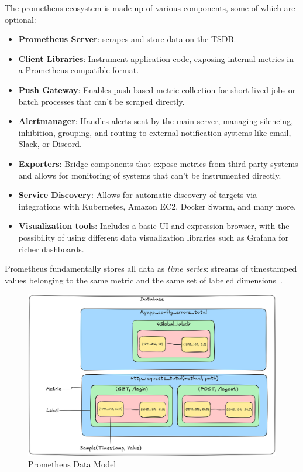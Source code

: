 The prometheus ecosystem is made up of various components, some of which are optional:

\begin{itemize}
    \item \textbf{Prometheus Server}: scrapes and store data on the \ac{TSDB}.
    \item \textbf{Client Libraries}: Instrument application code, exposing internal metrics in a
    Prometheus-compatible format.
    \item \textbf{Push Gateway}: Enables push-based metric collection for short-lived jobs or batch processes that
    can't be scraped directly.
    \item \textbf{Alertmanager}: Handles alerts sent by the main server, managing silencing, inhibition, grouping, and routing to external notification systems like email, Slack, or Discord.
    \item \textbf{Exporters}: Bridge components that expose metrics from third-party systems and allows for monitoring of
    systems that can't be instrumented directly.
    \item \textbf{Service Discovery}: Allows for automatic discovery of targets via integrations with Kubernetes,
    Amazon EC2, Docker Swarm, and many more.
    \item \textbf{Visualization tools}: Includes a basic UI and expression browser, with the possibility of using
    different data visualization libraries such as Grafana for richer dashboards.
\end{itemize}

Prometheus fundamentally stores all data as \textit{time series}: streams of timestamped
values belonging to the same metric and the same set of labeled dimensions~\cite{prometheus_data_model}.\\

\begin{figure}[h]
    \centering
    \includegraphics[width=0.9\linewidth, keepaspectratio]{./figures/samples_diagram}
    \caption{Prometheus Data Model}
\end{figure}



